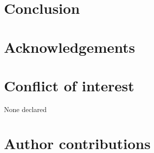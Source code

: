 \section*{Conclusion}
\label{sec:conclu1}

\section*{Acknowledgements}
\label{sec:acknowl1}

\section*{Conflict of interest}
\label{sec:conflict1}

None declared
\section*{Author contributions}
\label{sec:author1}

\cleardoublepage

\begin{otherlanguage}{english}

\end{otherlanguage}
